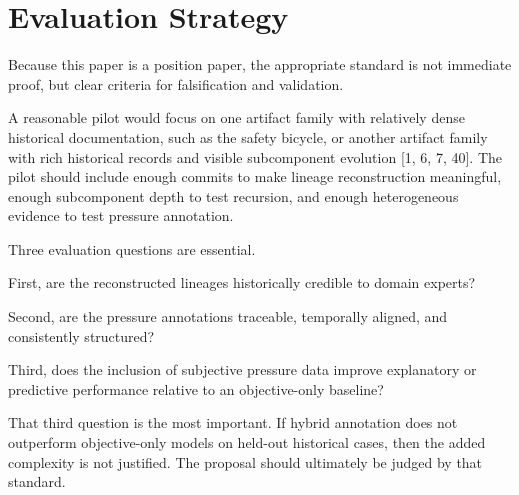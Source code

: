 \section{Evaluation Strategy}

Because this paper is a position paper, the appropriate standard is not immediate proof, but clear criteria for falsification and validation.

A reasonable pilot would focus on one artifact family with relatively dense historical documentation, such as the safety bicycle, or another artifact family with rich historical records and visible subcomponent evolution [1, 6, 7, 40]. The pilot should include enough commits to make lineage reconstruction meaningful, enough subcomponent depth to test recursion, and enough heterogeneous evidence to test pressure annotation.

Three evaluation questions are essential.

First, are the reconstructed lineages historically credible to domain experts?

Second, are the pressure annotations traceable, temporally aligned, and consistently structured?

Third, does the inclusion of subjective pressure data improve explanatory or predictive performance relative to an objective-only baseline?

That third question is the most important. If hybrid annotation does not outperform objective-only models on held-out historical cases, then the added complexity is not justified. The proposal should ultimately be judged by that standard.
